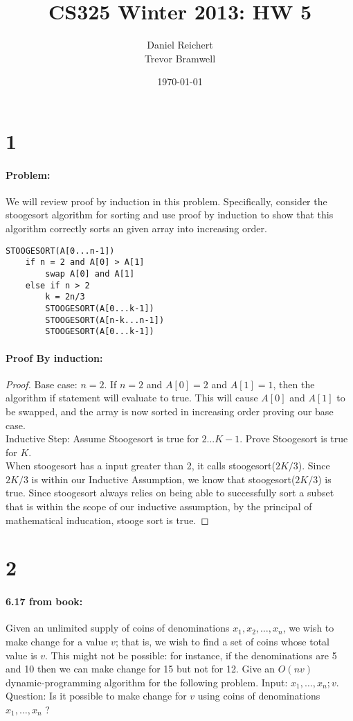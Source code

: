 \documentclass[12pt]{article}
\title{CS325 Winter 2013: HW 5}
\author{
    Daniel Reichert \\
    Trevor Bramwell \\
}
\date{\today}
\newcommand{\BigO}[1]{\ensuremath{O(#1)}}
\begin{document}
\maketitle
\section*{1}
\paragraph{Problem:}
We will review proof by induction in this problem. Specifically, consider the
stoogesort algorithm for sorting and use proof by induction to show that this
algorithm correctly sorts an given array into increasing order.
\begin{lstlisting}[mathescape]
STOOGESORT(A[0...n-1])
    if n = 2 and A[0] > A[1]
        swap A[0] and A[1]
    else if n > 2
        k = 2n/3
        STOOGESORT(A[0...k-1])
        STOOGESORT(A[n-k...n-1])
        STOOGESORT(A[0...k-1])
\end{lstlisting}
\paragraph{Proof By induction:}
\begin{proof}
Base case: $n = 2$.
If $n=2$ and $A[0] = 2$ and $A[1] = 1$, then the algorithm if statement
will evaluate to true.  This will cause $A[0]$ and $A[1]$ to be swapped,
and the array is now sorted in increasing order proving our base case.
\\
Inductive Step:
Assume Stoogesort is true for $2...K-1$.
Prove Stoogesort is true for $K$.
\\
When stoogesort has a input greater than 2, it calls stoogesort($2K/3$).
Since $2K/3$ is within our Inductive Assumption, we know that
stoogesort($2K/3$) is true.  Since stoogesort always relies on being
able to successfully sort a subset that is within the scope of our
inductive assumption, by the principal of mathematical inducation,
stooge sort is true.
\end{proof}

\section*{2}
\paragraph{6.17 from book:}
Given an unlimited supply of coins of denominations $x_1 , x_2 , \dots ,
x_n$, we wish to make change for a value $v$; that is, we wish to find a
set of coins whose total value is $v$. This might not be possible: for
instance, if the denominations are 5 and 10 then we can make change for
15 but not for 12.  Give an $\BigO{nv}$ dynamic-programming algorithm
for the following problem.  Input: $x_1 , \dots , x_n ; v$.  Question:
Is it possible to make change for $v$ using coins of denominations $x_1
, \dots , x_n$ ?
\end{document}
